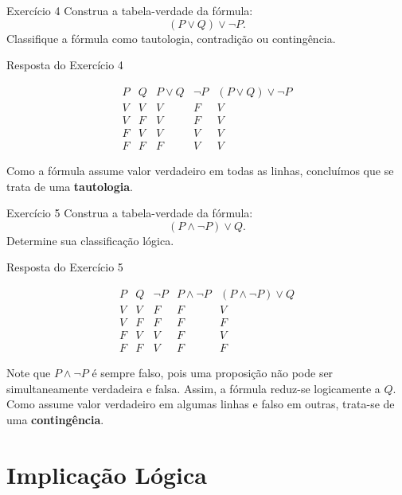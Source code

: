 \documentclass[12pt,a4paper,openright]{book}
\begin{document}
\begin{block}{Exercício 4}
Construa a tabela-verdade da fórmula:
\[
(P \lor Q) \lor \neg P.
\]
Classifique a fórmula como tautologia, contradição ou contingência.
\end{block}

\begin{block}{Resposta do Exercício 4}

\[
\begin{array}{c|c|c|c|c}
P & Q & P \lor Q & \neg P & (P \lor Q) \lor \neg P \\ \hline
V & V & V & F & V \\
V & F & V & F & V \\
F & V & V & V & V \\
F & F & F & V & V
\end{array}
\]

Como a fórmula assume valor verdadeiro em todas as linhas, concluímos que se trata de uma \textbf{tautologia}.
\end{block}

\begin{block}{Exercício 5}
Construa a tabela-verdade da fórmula:
\[
(P \land \neg P) \lor Q.
\]
Determine sua classificação lógica.
\end{block}

\begin{block}{Resposta do Exercício 5}

\[
\begin{array}{c|c|c|c|c|c}
P & Q & \neg P & P \land \neg P & (P \land \neg P) \lor Q \\ \hline
V & V & F & F & V \\
V & F & F & F & F \\
F & V & V & F & V \\
F & F & V & F & F
\end{array}
\]

Note que \(P \land \neg P\) é sempre falso, pois uma proposição não pode ser simultaneamente verdadeira e falsa. Assim, a fórmula reduz-se logicamente a \(Q\). Como assume valor verdadeiro em algumas linhas e falso em outras, trata-se de uma \textbf{contingência}.
\end{block}




\chapter{Implicação Lógica}
\end{document}
